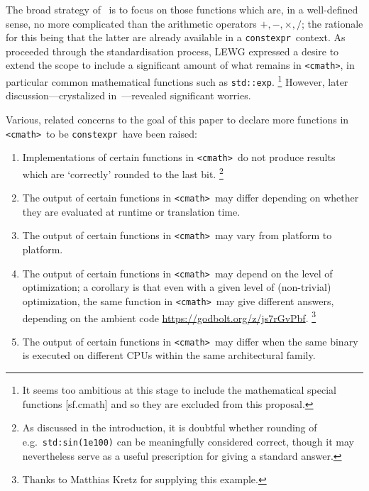 \documentclass[prd,twocolumn,amsmath,amssymb,nofootinbib,eqsecnum]{revtex4-1}
\newcommand{\constexpr}{\code{constexpr}\xspace}
\newcommand{\code}[1]{{\tt #1}}
\newcommand{\header}[1]{{\tt <#1>}}
\newcommand{\cmath}{\header{cmath}}
\newcommand{\Operators}{\ensuremath{+,-,\times,/}}
\begin{document}
The broad strategy of~\cite{Rosten-constexpr} is to focus on those functions which are, in a well-defined sense, no more complicated than the arithmetic operators \Operators; the rationale for this being that the latter are already available in a \constexpr\ context.
As~\cite{Rosten-constexpr} proceeded through the standardisation process, LEWG expressed a desire 
to extend the scope to include a significant amount of what remains in \cmath, in particular common mathematical functions such as \code{std::exp}.%
\footnote{It seems too ambitious at this stage to include the mathematical special functions [sf.cmath] and so they are excluded from this proposal.}
However, later discussion---crystalized in~\cite{Timmons-Less}---revealed significant worries.

Various, related concerns to the goal of this paper to declare more functions in \cmath\ to be \constexpr\ have been raised:
\begin{enumerate}
	\item Implementations of certain functions in \cmath\ do not produce results which are `correctly' rounded to the last bit.%
	\footnote{As discussed in the introduction, it is doubtful whether rounding of e.g.\ \code{std:sin(1e100)} can be meaningfully considered correct, though it may nevertheless serve as a useful prescription for giving a standard answer.}	
			
	\item The output of certain functions in \cmath\ may differ depending on whether they are evaluated at runtime or translation time.
	
	\item The output of certain functions in \cmath\ may vary from platform to platform.
	
	\item The output of certain functions in \cmath\ may depend on the level of optimization; a corollary
	is that even with a given level of (non-trivial) optimization, the same function in \cmath\ may give 
	different answers, depending on the ambient 
	code \href{https://godbolt.org/z/js7rGvPbf}{https://godbolt.org/z/js7rGvPbf}.%
	\footnote{Thanks to Matthias Kretz for supplying this example.}
	
	\item The output of certain functions in \cmath\ may differ when the same binary is executed on
	different CPUs within the same architectural family.

\end{enumerate}
\end{document}
